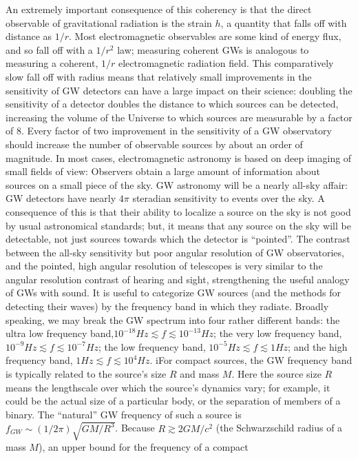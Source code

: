 \documentclass[binding=0.6cm, LaM]{sapthesis}
\begin{document}
An extremely important consequence of this coherency is that the direct observable of gravitational radiation is the strain $h$, a quantity that falls off with distance as $1/r$.
Most electromagnetic observables are some kind of energy flux, and so fall off with a $1/r^2$ law; measuring coherent GWs is analogous to measuring a coherent, $1/r$
electromagnetic radiation field. This comparatively slow fall off with radius means that relatively small improvements in the sensitivity of GW detectors can have a large impact on their science:
doubling the sensitivity of a detector doubles the distance to which sources can be detected, increasing the volume of the Universe to which sources are measurable by a factor of 8.
Every factor of two improvement in the sensitivity of a GW observatory should increase the number of observable sources by about an order of magnitude.
In most cases, electromagnetic astronomy is based on deep imaging of small fields of view: Observers obtain a large amount of information about sources on a small piece of the sky.
GW astronomy will be a nearly all-sky affair: GW detectors have nearly $4\pi$ steradian sensitivity to events over the sky. A consequence of this is that their ability to localize a source on the sky
 is not good by usual astronomical standards; but, it means that any source on the sky will be detectable, not just sources towards which the detector is “pointed”.
The contrast between the all-sky sensitivity but poor angular resolution of GW observatories, and the pointed, high angular resolution of telescopes is very similar to the angular resolution contrast
 of hearing and sight, strengthening the useful analogy of GWs with sound.
It is useful to categorize GW sources (and the methods for detecting their waves) by the frequency band in which they radiate.
Broadly speaking, we may break the GW spectrum into four rather different bands: the ultra low frequency band,$10^{-18}Hz \apprle f \apprle 10^{-13} Hz$;
the very low frequency band, $10^{-9} Hz \apprle f \apprle 10^{-7} Hz$; the low frequency band, $10^{-5} Hz \apprle f \apprle 1Hz$; and the high frequency band, $1Hz \apprle f \apprle 10^4 Hz$.
iFor compact sources, the GW frequency band is typically related to the source’s size $R$ and mass $M$.
Here the source size $R$ means the lengthscale over which the source’s dynamics vary; for example, it could be the actual size of a particular body, or the separation of members of a binary.
The “natural” GW frequency of such a source is $f_{GW} \sim (1/2\pi)\sqrt{GM/R^3}$. Because $R \apprge 2GM/c^2$ (the Schwarzschild radius of a mass $M$), an upper bound for the frequency of a compact
\end{document}
